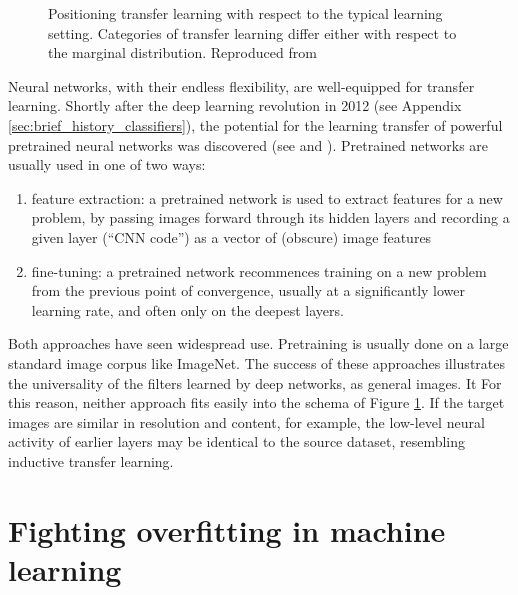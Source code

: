 \begin{figure}
\caption{Positioning transfer learning with respect to the typical learning setting. Categories of transfer learning differ either with respect to the marginal distribution. Reproduced from }
\label{fig:transfer_modes}
\end{figure}

Neural networks, with their endless flexibility, are well-equipped for transfer learning. Shortly after the deep learning revolution in 2012 (see Appendix \ref{sec:brief_history_classifiers}), the potential for the learning transfer of powerful pretrained neural networks was discovered (see \cite{zeiler2014visualizing} and \cite{sharif2014cnn}). Pretrained networks are usually used in one of two ways:

\begin{enumerate}
\item feature extraction: a pretrained network is used to extract features for a new problem, by passing images forward through its hidden layers and recording a given layer (``CNN code'') as a vector of (obscure) image features
\item fine-tuning: a pretrained network recommences training on a new problem from the previous point of convergence, usually at a significantly lower learning rate, and often only on the deepest layers.
\end{enumerate}

Both approaches have seen widespread use. Pretraining is usually done on a large standard image corpus like ImageNet. The success of these approaches illustrates the universality of the filters learned by deep networks, as general images. It  For this reason, neither approach fits easily into the schema of Figure \ref{fig:transfer_modes}. If the target images are similar in resolution and content, for example, the low-level neural activity of earlier layers may be identical to the source dataset, resembling inductive transfer learning.

\section{Fighting overfitting in machine learning}

